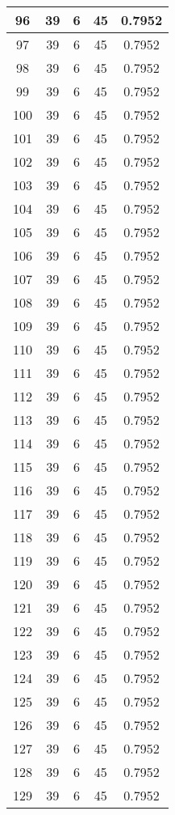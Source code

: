 \documentclass[letterpaper, 12pt]{article}
\begin{document}
\begin{longtable}{|c|c|c|c|c|}
\hline
96 & 39 & 6 & 45 & 0.7952 \\
\hline
97 & 39 & 6 & 45 & 0.7952 \\
\hline
98 & 39 & 6 & 45 & 0.7952 \\
\hline
99 & 39 & 6 & 45 & 0.7952 \\
\hline
100 & 39 & 6 & 45 & 0.7952 \\
\hline
101 & 39 & 6 & 45 & 0.7952 \\
\hline
102 & 39 & 6 & 45 & 0.7952 \\
\hline
103 & 39 & 6 & 45 & 0.7952 \\
\hline
104 & 39 & 6 & 45 & 0.7952 \\
\hline
105 & 39 & 6 & 45 & 0.7952 \\
\hline
106 & 39 & 6 & 45 & 0.7952 \\
\hline
107 & 39 & 6 & 45 & 0.7952 \\
\hline
108 & 39 & 6 & 45 & 0.7952 \\
\hline
109 & 39 & 6 & 45 & 0.7952 \\
\hline
110 & 39 & 6 & 45 & 0.7952 \\
\hline
111 & 39 & 6 & 45 & 0.7952 \\
\hline
112 & 39 & 6 & 45 & 0.7952 \\
\hline
113 & 39 & 6 & 45 & 0.7952 \\
\hline
114 & 39 & 6 & 45 & 0.7952 \\
\hline
115 & 39 & 6 & 45 & 0.7952 \\
\hline
116 & 39 & 6 & 45 & 0.7952 \\
\hline
117 & 39 & 6 & 45 & 0.7952 \\
\hline
118 & 39 & 6 & 45 & 0.7952 \\
\hline
119 & 39 & 6 & 45 & 0.7952 \\
\hline
120 & 39 & 6 & 45 & 0.7952 \\
\hline
121 & 39 & 6 & 45 & 0.7952 \\
\hline
122 & 39 & 6 & 45 & 0.7952 \\
\hline
123 & 39 & 6 & 45 & 0.7952 \\
\hline
124 & 39 & 6 & 45 & 0.7952 \\
\hline
125 & 39 & 6 & 45 & 0.7952 \\
\hline
126 & 39 & 6 & 45 & 0.7952 \\
\hline
127 & 39 & 6 & 45 & 0.7952 \\
\hline
128 & 39 & 6 & 45 & 0.7952 \\
\hline
129 & 39 & 6 & 45 & 0.7952 \\

\end{longtable}
\end{document}
